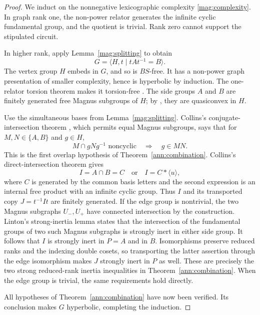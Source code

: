 \begin{proof}
We induct on the nonnegative lexicographic complexity
\eqref{mag:complexity}.  In graph rank one, the non-power relator
generates the infinite cyclic fundamental group, and the quotient
is trivial.  Rank zero cannot support the stipulated circuit.

In higher rank, apply Lemma~\ref{mag:splitting} to obtain
\[
 G=\langle H,t\mid tAt^{-1}=B\rangle.
\]
The vertex group $H$ embeds in $G$, and so is $BS$-free.
It has a non-power graph presentation of smaller complexity,
hence is hyperbolic by induction.  The one-relator torsion
theorem makes it torsion-free
\cite[Theorem~2]{McCoolSchupp1973}.
The side groups $A$ and $B$ are finitely generated free Magnus
subgroups of $H$; by
\cite[Theorem~4.7]{LintonHyperbolic2026}, they are quasiconvex in
$H$.

Use the simultaneous bases from Lemma~\ref{mag:splitting}.
Collins's conjugate-intersection theorem
\cite[Theorem~2]{Collins2008Conjugates}, which permits equal
Magnus subgroups, says that for $M,N\in\{A,B\}$ and $g\in H$,
\[
 M\cap gNg^{-1}\text{ noncyclic}\quad\Longrightarrow\quad g\in MN.
\]
This is the first overlap hypothesis of
Theorem~\ref{ann:combination}.
Collins's direct-intersection theorem
\cite[Theorem~1]{Collins2008Conjugates} gives
\[
 I=A\cap B=C\quad\text{or}\quad I=C*\langle u\rangle,
\]
where $C$ is generated by the common basis letters and the
second expression is an internal free product with an infinite
cyclic group.  Thus $I$ and its transported copy $J=t^{-1}It$
are finitely generated.
If the edge group is nontrivial, the two Magnus subgraphs
$U_-,U_+$ have connected intersection by the construction.
Linton's strong-inertia lemma
\cite[Lemma~2.10]{LintonHierarchies2025} states that the
intersection of the fundamental groups of two such Magnus
subgraphs is strongly inert in either side group.
It follows that $I$ is strongly inert in $P=A$ and in $B$.
Isomorphisms preserve reduced ranks and the indexing double
cosets, so transporting the latter assertion through the edge
isomorphism makes $J$ strongly inert in $P$ as well.
These are precisely the two strong reduced-rank inertia
inequalities in Theorem~\ref{ann:combination}.
When the edge group is trivial, the same requirements hold
directly.

All hypotheses of Theorem~\ref{ann:combination} have now been
verified.  Its conclusion makes $G$ hyperbolic, completing the
induction.
\end{proof}

